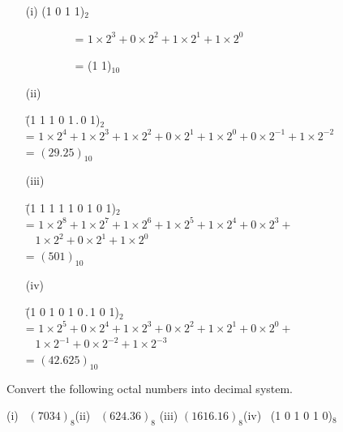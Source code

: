 \begin{solution}
\begin{itemize}
\item[(i)] (1 0 1 1)$_{2}$

\qquad~~~~~~~~ = $1\times 2^{3}+0\times 2^{2}+1\times 2^{1}+1\times 2^{0}$

\qquad~~~~~~~~ = (1 1)$_{10}$

\item[(ii)]
\begin{tabbing}
\= (1 1 1 0 1\,.\,0 1)$_{2}$\\[3pt]
\> = $1\times 2^{4}+1\times 2^{3}+1\times 2^{2}+0\times 2^{1}+1\times 2^{0}+0\times 2^{-1}+1\times 2^{-2}$\\[3pt]
\> = $(29.25)_{10}$
\end{tabbing}

\item[(iii)]
\begin{tabbing}
\= (1 1 1 1 1 0 1 0 1)$_{2}$\\[3pt]
\>= $1\times 2^{8}+1\times 2^{7}+1\times 2^{6}+1\times 2^{5}+1\times 2^{4}+0\times 2^{3}+$\\[3pt]
\>~ $1\times 2^{2}+0\times 2^{1}+1\times 2^{0}$\\[3pt]
\>= $(501)_{10}$
\end{tabbing}

\item[(iv)]
\begin{tabbing}
\= (1 0 1 0 1 0\,.\,1 0 1)$_{2}$\\[4pt]
\>= $1\times 2^{5}+0\times 2^{4}+1\times 2^{3}+0\times 2^{2}+1\times 2^{1}+0\times 2^{0}+$\\[4pt]
\>~ $1\times 2^{-1}+0\times 2^{-2}+1\times 2^{-3}$\\[4pt]
\>= $(42.625)_{10}$
\end{tabbing}
\end{itemize}
\end{solution}

\begin{problem}\label{prob5.2}
Convert the following octal numbers into decimal system.

\medskip
(i)~ $(7034)_{8}$\hfil (ii)~ $(624.36)_{8}$\hfil
(iii) $(1616.16)_{8}$\hfil (iv)~  (1 0 1 0 1 0)$_{8}$
\end{problem}


